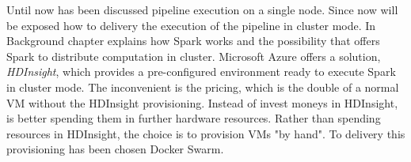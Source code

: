 Until now has been discussed pipeline execution on a single node. Since now will be exposed how to delivery the execution of the pipeline in cluster mode.\newline
In Background chapter explains how Spark works and the possibility that offers Spark to distribute computation in cluster. Microsoft Azure offers a solution, \textit{HDInsight}, which provides a pre-configured environment ready to execute Spark in cluster mode. The inconvenient is the pricing, which is the double of a normal VM without the HDInsight provisioning. Instead of invest moneys in HDInsight, is better spending them in further hardware resources.\newline
Rather than spending resources in HDInsight, the choice is to provision VMs "by hand". To delivery this provisioning has been chosen Docker Swarm.

